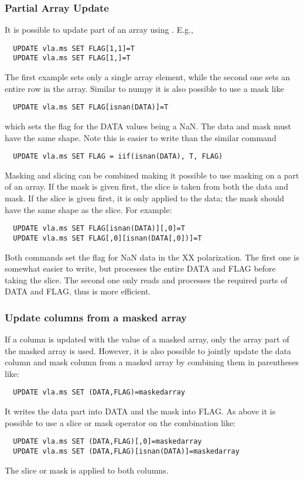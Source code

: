 \subsubsection{Partial Array Update}    
It is possible to update part of an array using
. E.g.,
\begin{verbatim}
  UPDATE vla.ms SET FLAG[1,1]=T
  UPDATE vla.ms SET FLAG[1,]=T
\end{verbatim}
The first example sets only a single array element, while the second
one sets an entire row in the array. Similar to numpy it is also
possible to use a mask like
\begin{verbatim}
  UPDATE vla.ms SET FLAG[isnan(DATA)]=T
\end{verbatim}
which sets the flag for the DATA values being a NaN. The data and mask
must have the same shape. Note this is
easier to write than the similar command
\begin{verbatim}
  UPDATE vla.ms SET FLAG = iif(isnan(DATA), T, FLAG)
\end{verbatim}
Masking and slicing can be combined making it possible to use masking
on a part of an array. If the mask is given first, the slice is taken
from both the data and mask. If the slice is given first, it is only
applied to the data; the mask should have the same shape as the slice.
For example:
\begin{verbatim}
  UPDATE vla.ms SET FLAG[isnan(DATA)][,0]=T
  UPDATE vla.ms SET FLAG[,0][isnan(DATA[,0])]=T
\end{verbatim}
Both commands set the flag for NaN data in the XX polarization.
The first one is somewhat easier to write, but processes the entire DATA
and FLAG before taking the slice. The second one
only reads and processes the required parts of DATA and FLAG, thus is
more efficient.

\subsubsection{Update columns from a masked array}
If a column is updated with the value of a masked array, only the
array part of the masked array is used. However, it is also possible to
jointly update the data column and mask column from a masked array by
combining them in parentheses like:
\begin{verbatim}
  UPDATE vla.ms SET (DATA,FLAG)=maskedarray
\end{verbatim}
It writes the data part into DATA and the mask into FLAG.
As above it is possible to use a slice or mask operator on the combination like:
\begin{verbatim}
  UPDATE vla.ms SET (DATA,FLAG)[,0]=maskedarray
  UPDATE vla.ms SET (DATA,FLAG)[isnan(DATA)]=maskedarray
\end{verbatim}
The slice or mask is applied to both columns.



